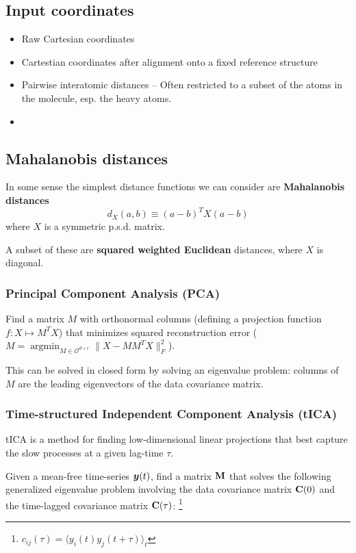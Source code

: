 \documentclass[aps,prl,preprint,nofootinbib,superscriptaddress,linenumbers]{revtex4-1}
\newcommand{\bfv}[1]{{\mbox{\boldmath{$#1$}}}}
\newcommand{\bfm}[1]{{\bf #1}}
\DeclareMathOperator*{\argmin}{argmin}
\newcommand{\bemph}[1]{\textbf{#1}}
\begin{document}
\subsection{Input coordinates}
\begin{itemize}
	\item Raw Cartesian coordinates
	\item Cartestian coordinates after alignment onto a fixed reference structure
	\item Pairwise interatomic distances -- Often restricted to a subset of the atoms in the molecule, esp. the heavy atoms.
	\item 
\end{itemize}


\subsection{Mahalanobis distances}
In some sense the simplest distance functions we can consider are \bemph{Mahalanobis distances} $$d_X(a,b) \equiv (a-b)^T X (a-b) $$ where $X$ is a symmetric p.s.d. matrix.

A subset of these are \bemph{squared weighted Euclidean} distances, where $X$ is diagonal.

\subsubsection{Principal Component Analysis (PCA)}
Find a matrix $M$ with orthonormal columns (defining a projection function $f:X\mapsto M^T X$) that minimizes squared reconstruction error ($M = \argmin_{M \in \mathcal{O}^{d \times r}} \|X-MM^TX\|^2_F$).

This can be solved in closed form by solving an eigenvalue problem: columns of $M$ are the leading eigenvectors of the data covariance matrix.

\subsubsection{Time-structured Independent Component Analysis (tICA)}
tICA is a method for finding low-dimensional linear projections that best capture the slow processes at a given lag-time $\tau$.

Given a mean-free time-series $\bfv{y}(t)$, find a matrix $\bfm{M}$ that solves the following generalized eigenvalue problem involving the data covariance matrix $\bfm{C}(0)$ and the time-lagged covariance matrix $\bfm{C}(\tau)$:
\footnote{$c_{ij}(\tau) = \langle y_i(t) y_j(t+\tau)\rangle_t$}
\end{document}
